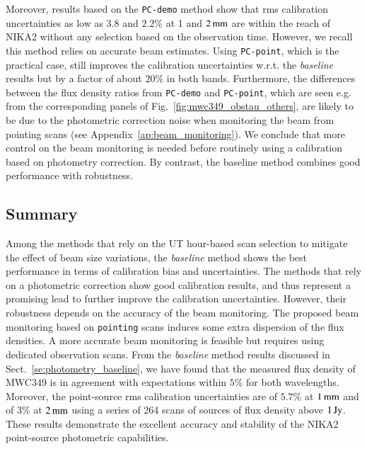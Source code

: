 \documentclass[traditionalabstract]{aa}
\newcommand{\lp}[1]{#1}
\newcommand{\rev}[1]{#1}
\begin{document}
Moreover, results based on the {\tt PC-demo} method show that rms
calibration uncertainties as low as $3.8$ and $2.2\%$
at 1 and $2\,\rm{mm}$ are within the reach of NIKA2 {\lp without any
selection based on the observation time.}
However, we recall this method relies on 
accurate beam estimates. Using {\tt PC-point}, which is the
practical case, still improves the calibration uncertainties
w.r.t. the \emph{baseline} results but by a factor of about $20\%$ in both
bands. Furthermore, the differences between
the flux density ratios from {\tt PC-demo} and {\tt PC-point}, which are
seen e.g. from the corresponding panels of
Fig.~\ref{fig:mwc349_obstau_others}, are likely
to be due to the photometric correction noise
when monitoring the beam from pointing scans (see
Appendix~\ref{ap:beam_monitoring}). We conclude that more
control on the beam monitoring is needed before routinely using a calibration
based on photometry correction. By contrast, the baseline method
combines good performance with robustness.


\subsection{Summary}
\label{se:photometry_summary}
Among the methods that rely on the UT hour-based
scan selection to mitigate the effect of beam size variations, the
\emph{baseline} method shows the best performance in terms of calibration
bias and uncertainties. The methods that rely on a photometric correction
show good calibration results, and thus represent a promising lead
to further improve the calibration uncertainties. However, their
robustness depends on the accuracy of the beam monitoring. {\lp The
proposed beam monitoring based on {\tt pointing} scans induces some
extra dispersion of the flux densities. A more accurate beam monitoring is
feasible but requires using dedicated observation scans.} 
From the \emph{baseline} method results discussed in
Sect.~\ref{se:photometry_baseline}, we have found that the measured
flux density of MWC349 is in agreement with expectations within $5\%$
for both wavelengths. Moreover, the {\rev point-source} rms calibration
uncertainties are of $5.7\%$ at $1\,\rm{mm}$ and of $3\%$ at $2\,\rm{mm}$
using a series of 264 scans of sources of flux density above
$1\, \rm{Jy}$.
These results demonstrate the excellent accuracy and stability of the
NIKA2 {\rev point-source} photometric capabilities.

\end{document}

